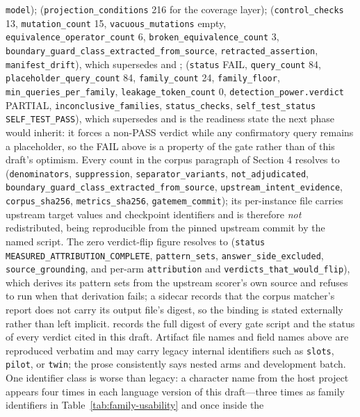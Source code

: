 \documentclass[11pt]{article}
\begin{document}
\begin{sloppypar}
\texttt{model});  (\texttt{projection\_conditions} 216 for the coverage layer);  (\texttt{control\_checks} 13, \texttt{mutation\_count} 15, \texttt{vacuous\_mutations} empty, \texttt{equivalence\_operator\_count} 6, \texttt{broken\_equivalence\_count} 3, \texttt{boundary\_guard\_class\_extracted\_from\_source}, \texttt{retracted\_assertion}, \texttt{manifest\_drift}), which supersedes  and ;  (\texttt{status} FAIL, \texttt{query\_count} 84, \texttt{placeholder\_query\_count} 84, \texttt{family\_count} 24, \texttt{family\_floor}, \texttt{min\_queries\_per\_family}, \texttt{leakage\_token\_count} 0, \texttt{detection\_power.verdict} PARTIAL, \texttt{inconclusive\_families}, \texttt{status\_checks}, \texttt{self\_test\_status} \texttt{SELF\_TEST\_PASS}), which supersedes  and is the readiness state the next phase would inherit: it forces a non-PASS verdict while any confirmatory query remains a placeholder, so the FAIL above is a property of the gate rather than of this draft's optimism. Every count in the corpus paragraph of Section 4 resolves to  (\texttt{denominators}, \texttt{suppression}, \texttt{separator\_variants}, \texttt{not\_adjudicated}, \texttt{boundary\_guard\_class\_extracted\_from\_source}, \texttt{upstream\_intent\_evidence}, \texttt{corpus\_sha256}, \texttt{metrics\_sha256}, \texttt{gatemem\_commit}); its per-instance file  carries upstream target values and checkpoint identifiers and is therefore \emph{not} redistributed, being reproducible from the pinned upstream commit by the named script. The zero verdict-flip figure resolves to  (\texttt{status} \texttt{MEASURED\_ATTRIBUTION\_COMPLETE}, \texttt{pattern\_sets}, \texttt{answer\_side\_excluded}, \texttt{source\_grounding}, and per-arm \texttt{attribution} and \texttt{verdicts\_that\_would\_flip}), which derives its pattern sets from the upstream scorer's own source and refuses to run when that derivation fails; a sidecar  records that the corpus matcher's report does not carry its output file's digest, so the binding is stated externally rather than left implicit.  records the full digest of every gate script and the status of every verdict cited in this draft. Artifact file names and field names above are reproduced verbatim and may carry legacy internal identifiers such as \texttt{slots}, \texttt{pilot}, or \texttt{twin}; the prose consistently says nested arms and development batch. One identifier class is worse than legacy: a character name from the host project appears four times in each language version of this draft---three times as family identifiers in Table~\ref{tab:family-usability} and once inside the 
\end{sloppypar}
\end{document}
